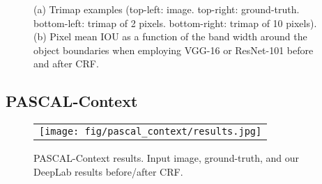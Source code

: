 \documentclass[10pt,journal,compsoc]{IEEEtran}
\begin{document}
\begin{figure}[!t]
\centering
{}
  \caption{(a) Trimap examples (top-left: image. top-right: ground-truth. bottom-left: trimap of 2 pixels.
    bottom-right: trimap of 10 pixels). (b) Pixel mean IOU as a function of the band width around the
    object boundaries when employing VGG-16 or ResNet-101 before and after CRF.}
  \label{fig:IOUBoundary}
\end{figure}


\subsection{PASCAL-Context}
\label{exp:pascal_context}

\begin{figure*}[!t]
  \centering
\scalebox{0.9} {
  \begin{tabular}{c}
    \texttt{[image: fig/pascal\_context/results.jpg]} \\
  \end{tabular}
  }
  \caption{PASCAL-Context results. Input image, ground-truth,
    and our DeepLab results before/after CRF.}
  \label{fig:pascal_context_val_results}
\end{figure*}
\end{document}
